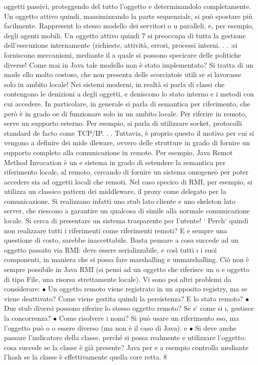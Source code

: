 \documentclass[a4paper,12pt]{article}
\begin{document}
oggetti passivi, proteggendo del tutto l'oggetto e determinandolo completamente. Un oggetto attivo quindi, massimizzando
la parte sequenziale,
si può spostare più facilmente. Rappresent lo stesso modello dei servitori
o
u
paralleli, e, per esempio, degli agenti mobili. Un oggetto attivo quindi
7
si preoccupa di tutta la gestione dell'esecuzione internamente (richieste,
attività, errori, processi interni. . . :si forniscono meccanismi, mediante il
a
quale si possono specicare delle politiche diverse!
Come mai in Java tale modello non è stato implementato? Si tratta di un mode
ello molto costoso, che non presenta delle scorciatoie utili se si lavorasse solo in
ambito locale!
Nei sistemi moderni, in realtà si parla di classi che contengono le denizioni
a
degli oggetti, e deniscono lo stato interno e i metodi con cui accedere. In particolare, in generale si parla di
semantica per riferimento, che però è in grado
oe
di funzionare solo in un ambito locale. Per riferire in remoto, serve un supporto
esterno. Per esempio, si parla di utilizzare socket, protocolli standard de facto
come TCP/IP. . .
Tuttavia, è proprio questo il motivo per cui si vengono a definire dei mide
dleware, ovvero delle strutture in grado di fornire un supporto completo alla
comunicazione in remoto. Per esempio, Java Remot Method Invocation è un
e
sistema in grado di estendere la semantica per riferimento locale, al remoto,
cercando di fornire un sistema omogeneo per poter accedere sia ad oggetti locali
che remoti. Nel caso specico di RMI, per esempio, si utilizza un classico pattern dei middleware, il proxy come delegato
per la comunicazione. Si realizzano
infatti uno stub lato cliente e uno skeleton lato server, che riescono a garantire
un qualcosa di simile alla normale comunicazione locale. Si cerca di presentare
un sistema trasparente per l'utente!
`
Perch` quindi non realizzare tutti i riferimenti come riferimenti remoti? E
e
sempre una questione di costo, sarebbe inaccettabile. Basta pensare a cosa
succede ad un oggetto passato via RMI: deve essere serializzabile, e così tutti
\i{}
i suoi componenti, in maniera che si possa fare marshalling e unmarshalling.
Ciò non è sempre possibile in Java RMI (si pensi ad un oggetto che riferisce un
o
e
oggetto di tipo File, una risorsa strettamente locale). Vi sono poi altri problemi
da considerare:
$\bullet$ Un oggetto remoto viene registrato in un apposito registry, ma se viene
deattivato? Come viene gestita quindi la persistenza? E lo stato remoto?
$\bullet$ Due stub diversi possono riferire lo stesso oggetto remoto? Se s` come si
\i{},
gestisce la concorrenza?
$\bullet$ Come risolvere i nomi? Si può usare un riferimento sso, ma l'oggetto può
o
o
essere diverso (ma non è il caso di Java).
e
$\bullet$ Si deve anche passare l'indicatore della classe, perché si possa realmente
e
utilizzare l'oggetto: cosa succede se la classe è già presente? Java per
e a
esempio controlla mediante l'hash se la classe è effettivamente quella core
retta.
8
\end{document}

